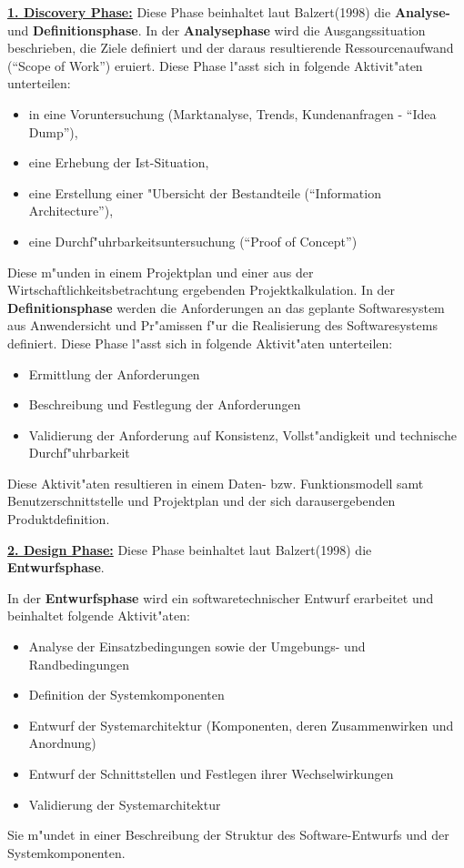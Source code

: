 \underline{\textbf{1. Discovery Phase:}}
\smallbreak
Diese Phase beinhaltet laut Balzert(1998)\supercite{Balzert1998} die \textbf{Analyse-} und \textbf{Definitionsphase}.
In der \textbf{Analysephase} wird die Ausgangssituation beschrieben,
die Ziele definiert und der daraus resultierende Ressourcenaufwand (\enquote{Scope of Work}) eruiert.\smallbreak
Diese Phase l"asst sich in folgende Aktivit"aten unterteilen:
\begin{itemize}
\item in eine Voruntersuchung (Marktanalyse, Trends, Kundenanfragen - \enquote{Idea Dump}),
\item eine Erhebung der Ist-Situation,
\item eine Erstellung einer "Ubersicht der Bestandteile (\enquote{Information Architecture}),
\item eine Durchf"uhrbarkeitsuntersuchung (\enquote{Proof of Concept})
\end{itemize}
Diese m"unden in einem Projektplan und einer aus der Wirtschaftlichkeitsbetrachtung ergebenden Projektkalkulation.
\smallbreak
In der \textbf{Definitionsphase} werden die Anforderungen an das geplante Softwaresystem aus Anwendersicht und Pr"amissen f"ur die Realisierung des Softwaresystems definiert.\smallbreak
Diese Phase l"asst sich in folgende Aktivit"aten unterteilen:
\begin{itemize}
\item Ermittlung der Anforderungen
\item Beschreibung und Festlegung der Anforderungen
\item Validierung der Anforderung auf Konsistenz, Vollst"andigkeit und technische Durchf"uhrbarkeit
\end{itemize}

Diese Aktivit"aten resultieren in einem Daten- bzw. Funktionsmodell samt Benutzerschnittstelle und Projektplan und der sich darausergebenden Produktdefinition.

\bigbreak
\underline{\textbf{2. Design Phase:}}
\smallbreak
Diese Phase beinhaltet laut Balzert(1998)\supercite{Balzert1998} die \textbf{Entwurfsphase}.

In der \textbf{Entwurfsphase} wird ein softwaretechnischer Entwurf erarbeitet und beinhaltet folgende Aktivit"aten:
\begin{itemize}
  \item Analyse der Einsatzbedingungen sowie der Umgebungs- und Randbedingungen
  \item Definition der Systemkomponenten
  \item Entwurf der Systemarchitektur (Komponenten, deren Zusammenwirken und Anordnung)
  \item Entwurf der Schnittstellen und Festlegen ihrer Wechselwirkungen
  \item Validierung der Systemarchitektur
\end{itemize}
Sie m"undet in einer Beschreibung der Struktur des Software-Entwurfs und der Systemkomponenten.

